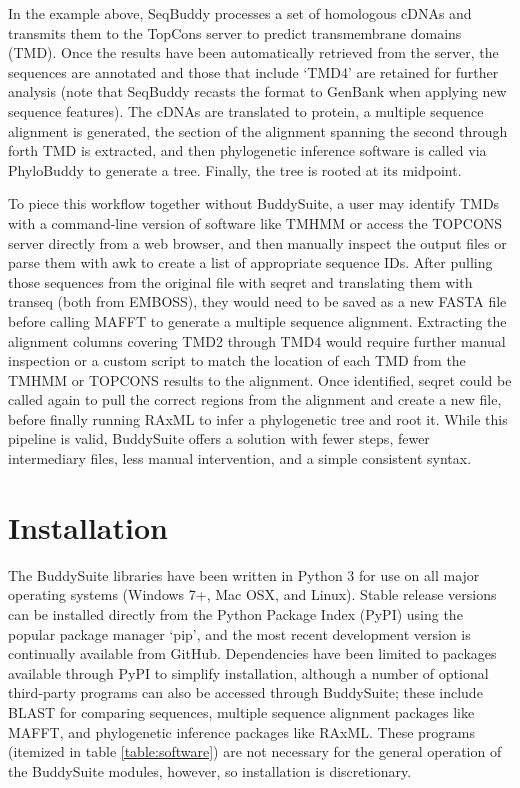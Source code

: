 \documentclass[nogrid]{MBE_article}%
\begin{document}
In the example above, SeqBuddy processes a set of homologous cDNAs and transmits them to the TopCons server \cite{Tsirigos:2015eo} to predict transmembrane domains (TMD). Once the results have been automatically retrieved from the server, the sequences are annotated and those that include `TMD4' are retained for further analysis (note that SeqBuddy recasts the format to GenBank when applying new sequence features). The cDNAs are translated to protein, a multiple sequence alignment is generated, the section of the alignment spanning the second through forth TMD is extracted, and then phylogenetic inference software is called via PhyloBuddy to generate a tree. Finally, the tree is rooted at its midpoint.

To piece this workflow together without BuddySuite, a user may identify TMDs with a command-line version of software like TMHMM \cite{Krogh:2001bv} or access the TOPCONS server directly from a web browser, and then manually inspect the output files or parse them with awk to create a list of appropriate sequence IDs. After pulling those sequences from the original file with seqret and translating them with transeq (both from EMBOSS), they would need to be saved as a new FASTA file before calling MAFFT to generate a multiple sequence alignment. Extracting the alignment columns covering TMD2 through TMD4 would require further manual inspection or a custom script to match the location of each TMD from the TMHMM or TOPCONS results to the alignment. Once identified, seqret could be called again to pull the correct regions from the alignment and create a new file, before finally running RAxML to infer a phylogenetic tree and root it. While this pipeline is valid, BuddySuite offers a solution with fewer steps, fewer intermediary files, less manual intervention, and a simple consistent syntax. 


\section{Installation}
The BuddySuite libraries have been written in Python 3 for use on all major operating systems (Windows 7+, Mac OSX, and Linux). Stable release versions can be installed directly from the Python Package Index (PyPI) using the popular package manager `pip', and the most recent development version is continually available from GitHub. Dependencies have been limited to packages available through PyPI to simplify installation, although a number of optional third-party programs can also be accessed through BuddySuite; these include BLAST for comparing sequences, multiple sequence alignment packages like MAFFT, and phylogenetic inference packages like RAxML. These programs (itemized in table \ref{table:software}) are not necessary for the general operation of the BuddySuite modules, however, so installation is discretionary.
\end{document}

